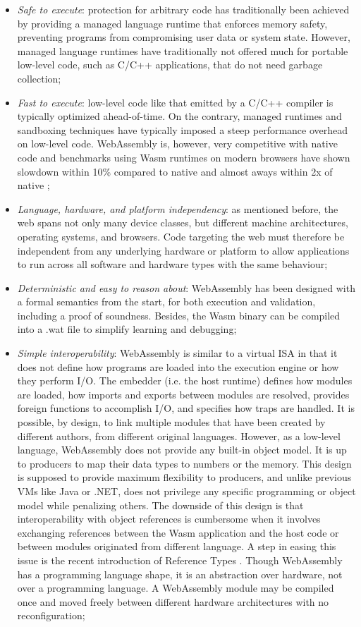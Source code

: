 \begin{itemize}
    \item \emph{Safe to execute}: protection for arbitrary code has traditionally been achieved by providing a managed language runtime that enforces memory safety, preventing programs from compromising user data or system state. However, managed language runtimes have traditionally not offered much for portable low-level code, such as C/C++ applications, that do not need garbage collection;
    \item \emph{Fast to execute}: low-level code like that emitted by a C/C++ compiler is typically optimized ahead-of-time. On the contrary, managed runtimes and sandboxing techniques have typically imposed a steep performance overhead on low-level code. WebAssembly is, however, very competitive with native code and benchmarks using Wasm runtimes on modern browsers have shown slowdown within 10\% compared to native and almost aways within 2x of native \cite{wasm};
    \item \emph{Language, hardware, and platform independency}: as mentioned before, the web spans not only many device classes, but different machine architectures, operating systems, and browsers. Code targeting the web must therefore be independent from any underlying hardware or platform to allow applications to run across all software and hardware types with the same behaviour;
    \item \emph{Deterministic and easy to reason about}: WebAssembly has been designed with a formal semantics from the start, for both execution and validation, including a proof of soundness. Besides, the Wasm binary can be compiled into a .wat file to simplify learning and debugging;
    \item \emph{Simple interoperability}: WebAssembly is similar to a virtual ISA in that it does not define how programs are loaded into the execution engine or how they perform I/O. The embedder (i.e. the host runtime) defines how modules are loaded, how imports and exports between modules are resolved, provides foreign functions to accomplish I/O, and specifies how traps are handled. It is possible, by design, to link multiple modules that have been created by different authors, from different original languages. However, as a low-level language, WebAssembly does not provide any built-in object model. It is up to producers to map their data types to numbers or the memory. This design is supposed to provide maximum flexibility to producers, and unlike previous VMs like Java or .NET, does not privilege any specific programming or object model while penalizing others. The downside of this design is that interoperability with object references is cumbersome when it involves exchanging references between the Wasm application and the host code or between modules originated from different language. A step in easing this issue is the recent introduction of Reference Types \cite{reference-types}. Though WebAssembly has a programming language shape, it is an abstraction over hardware, not over a programming language. A WebAssembly module may be compiled once and moved freely between different hardware architectures with no reconfiguration;

\end{itemize}
